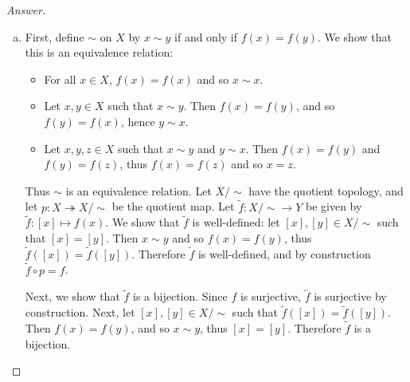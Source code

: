 \documentclass[12pt]{article}
\newcommand\paren[1]{\left( #1 \right)}
\theoremstyle{definition}
\begin{document}
\begin{proof}[Answer]
    \noindent
    \begin{enumerate}[(a)]
        \item First, define $\sim$ on $X$ by $x \sim y$ if and only if $f(x) = f(y)$. We show that this is an equivalence relation:
        \begin{itemize}
            \item For all $x \in X$, $f(x) = f(x)$ and so $x \sim x$.
            \item Let $x , y \in X$ such that $x \sim y$. Then $f(x) = f(y)$, and so $f(y) = f(x)$, hence $y \sim x$.
            \item Let $x , y , z \in X$ such that $x \sim y$ and $y \sim x$. Then $f(x) = f(y)$ and $f(y) = f(z)$, thus $f(x) = f(z)$ and so $x = z$.
        \end{itemize}
        Thus $\sim$ is an equivalence relation. Let $X / \sim$ have the quotient topology, and let $p : X \twoheadrightarrow X / \sim$ be the quotient map. Let $\tilde{f} : X / \sim \to Y$ be given by $\tilde{f} : [x] \mapsto f(x)$. We show that $\tilde{f}$ is well-defined: let $[x] , [y] \in X / \sim$ such that $[x] = [y]$. Then $x \sim y$ and so $f(x) = f(y)$, thus $\tilde{f} \paren{ [x] } = \tilde{f} \paren{ [y] }$. Therefore $\tilde{f}$ is well-defined, and by construction $\tilde{f} \circ p = f$. 
        
        Next, we show that $\tilde{f}$ is a bijection. Since $f$ is surjective, $\tilde{f}$ is surjective by construction. Next, let $[x] , [y] \in X / \sim$ such that $\tilde{f} \paren{ [x] } = \tilde{f} \paren{ [y] }$. Then $f(x) = f(y)$, and so $x \sim y$, thus $[x] = [y]$. Therefore $\tilde{f}$ is a bijection.
        

\end{enumerate}
\end{proof}
\end{document}
